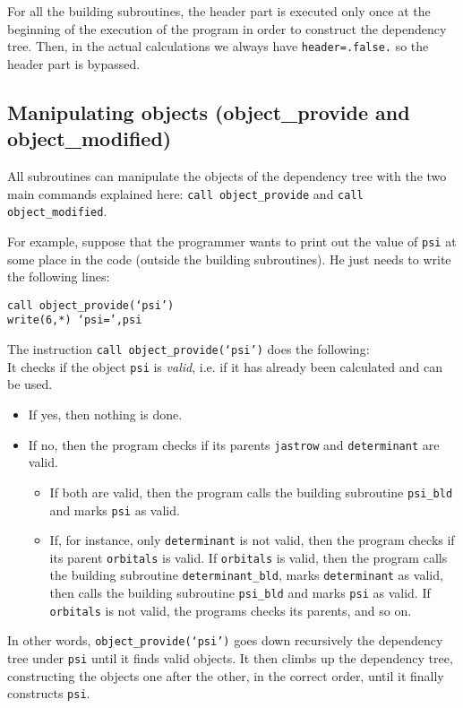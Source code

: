 \documentclass[a4paper,11pt]{article}
\begin{document}
\vspace{0.5cm}
For all the building subroutines, the header part is executed only once at the beginning of the execution of the program in order to construct the dependency tree. Then, in the actual calculations we always have {\tt header=.false.} so the header part is bypassed.

\subsection{Manipulating objects (object_provide and object_modified)}


All subroutines can manipulate the objects of the dependency tree with the two main commands explained here: {\tt call object_provide} and {\tt call object_modified}.

For example, suppose that the programmer wants to print out the value of {\tt psi} at some place in the code (outside the building subroutines). He just needs to write the following lines:

\vspace{0.5cm}
\noindent
{\tt call object_provide(`psi')\\
write(6,*) `psi=',psi}

\vspace{0.5cm}
The instruction {\tt call object_provide(`psi')} does the following:\\
It checks if the object {\tt psi} is {\it valid}, i.e. if it has already been calculated and can be used.
\begin{itemize}
\item If yes, then nothing is done. 
\item If no, then the program checks if its parents {\tt jastrow} and {\tt determinant} are valid. 
\begin{itemize}
\item If both are valid, then the program calls the building subroutine {\tt psi_bld} and marks {\tt psi} as valid.
\item If, for instance, only {\tt determinant} is not valid, then the program checks if its parent {\tt orbitals} is valid. If {\tt orbitals} is valid, then the program calls the building subroutine {\tt determinant_bld}, marks {\tt determinant} as valid, then calls the building subroutine {\tt psi_bld} and marks {\tt psi} as valid. If {\tt orbitals} is not valid, the programs checks its parents, and so on.
\end{itemize}
\end{itemize}
In other words, {\tt object_provide(`psi')} goes down recursively the dependency tree under {\tt psi} until it finds valid objects. It then climbs up the dependency tree, constructing the objects one after the other, in the correct order, until it finally constructs {\tt psi}.
\end{document}
